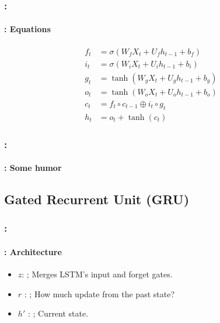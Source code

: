 \documentclass[xcolor=table]{beamer}
\begin{document}
\begin{frame}
	\frametitle{\insertshortsubtitle: \insertsection}
	\framesubtitle{\insertsubsection: Equations}
	\huge\vskip-24pt
	\begin{align*}
	f_t &= \sigma(W_f X_t + U_f h_{t-1} + b_f) \\
	i_t &= \sigma(W_i X_t + U_i h_{t-1} + b_i) \\
	g_t &= \tanh(W_g X_t + U_g h_{t-1} + b_g) \\
	o_t &= \tanh(W_o X_t + U_o h_{t-1} + b_o) \\
	c_t &= f_t \circ c_{t-1} \oplus i_t \circ g_t \\
	h_t &= o_t + \tanh(c_t)
	\end{align*}
\end{frame}

\begin{frame}
	\frametitle{\insertshortsubtitle: \insertsection}
	\framesubtitle{\insertsubsection: Some humor}

	\begin{center}
	\end{center}

\end{frame}

\subsection{Gated Recurrent Unit (GRU)}

\begin{frame}
	\frametitle{\insertshortsubtitle: \insertsection}
	\framesubtitle{\insertsubsection: Architecture}
	
	\begin{minipage}{0.50\textwidth} 
		\begin{itemize}
			\item $z$: ;
			Merges LSTM's input and forget gates. 
			\item $r$ : ; 
			How much update from the past state?
			\item $h'$ : ;
			Current state.	
		\end{itemize}
	\end{minipage}
	\begin{minipage}{0.49\textwidth}
	\end{minipage}

\end{frame}
\end{document}
